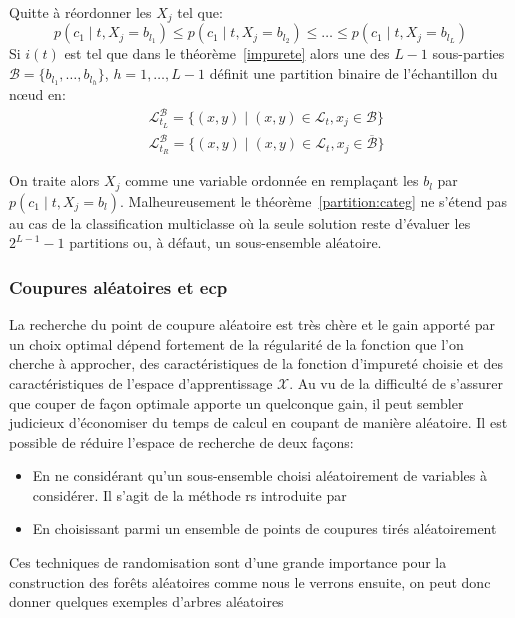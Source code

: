 \begin{theoreme}
\label{partition:categ}
    Quitte à réordonner les $X_j$ tel que:
    \begin{equation*}
        p(c_1 \mid t , X_j = b_{l_1} ) \leq p(c_1 \mid t , X_j = b_{l_2} ) \leq \dots \leq p(c_1 \mid t , X_j = b_{l_L} )
    \end{equation*}
    Si $i(t)$ est tel que dans le théorème~\ref{impurete} alors une des $L-1$ sous-parties $\mathcal{B} = \{b_{l_1},\dotsc,b_{l_h} \} $, $h=1,\dotsc,L-1$ définit une partition binaire de l'échantillon du nœud en:
    \begin{align*}
        &\mathcal{L}^{\mathcal{B}}_{t_L} = \{ (x,y) \mid (x,y) \in \mathcal{L}_{t} ,x_j \in \mathcal{B} \} \\
        &\mathcal{L}^{\mathcal{B}}_{t_R} = \{ (x,y) \mid (x,y) \in \mathcal{L}_{t} ,x_j \in \overbar{\mathcal{B}} \}
    \end{align*}
\end{theoreme}
On traite alors $X_j$ comme une variable ordonnée en remplaçant les $b_l$ par $p(c_1 \mid t , X_j = b_{l})$. Malheureusement le théorème~\ref{partition:categ} ne s'étend pas au cas de la classification multiclasse où la seule solution reste d'évaluer les $2^{L-1}-1$ partitions ou, à défaut, un sous-ensemble aléatoire.


\subsubsection{Coupures aléatoires et \ac{ecp}}

La recherche du point de coupure aléatoire est très chère et le gain apporté par un choix optimal dépend fortement de la régularité de la fonction que l'on cherche à approcher, des caractéristiques de la fonction d'impureté choisie et des caractéristiques de l'espace d'apprentissage $\mathcal{X}$. Au vu de la difficulté de s'assurer que couper de façon optimale apporte un quelconque gain, il peut sembler judicieux d'économiser du temps de calcul en coupant de manière aléatoire.
Il est possible de réduire l'espace de recherche de deux façons:
\begin{itemize}
    \item En ne considérant qu'un sous-ensemble choisi aléatoirement de variables à considérer. Il s'agit de la méthode \ac{rs} introduite par \citet{Ho1998}
    \item En choisissant parmi un ensemble de points de coupures tirés aléatoirement
\end{itemize}
Ces techniques de randomisation sont d'une grande importance pour la construction des forêts aléatoires comme nous le verrons ensuite, on peut donc donner quelques exemples d'arbres aléatoires

